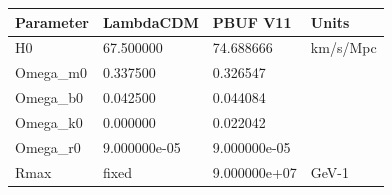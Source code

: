 \begin{tabular}{llll}
\toprule
Parameter & LambdaCDM & PBUF V11 & Units \\
\midrule
H0 & 67.500000 & 74.688666 & km/s/Mpc \\
Omega\_m0 & 0.337500 & 0.326547 &  \\
Omega\_b0 & 0.042500 & 0.044084 &  \\
Omega\_k0 & 0.000000 & 0.022042 &  \\
Omega\_r0 & 9.000000e-05 & 9.000000e-05 &  \\
Rmax & fixed & 9.000000e+07 & GeV-1 \\
\bottomrule
\end{tabular}
